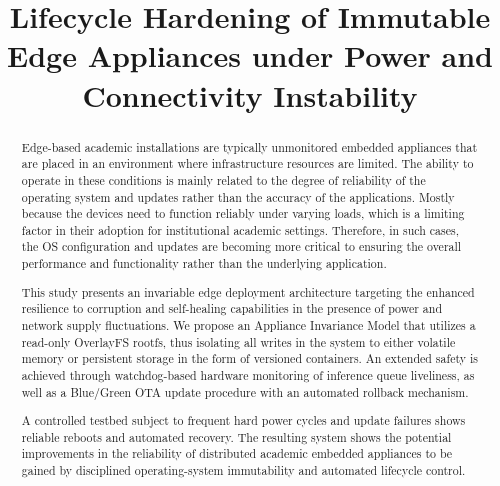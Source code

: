 \documentclass[conference]{IEEEtran}
\begin{document}
\title{Lifecycle Hardening of Immutable Edge Appliances under Power and Connectivity Instability}

\author{
}

\maketitle

\begin{abstract}
Edge-based academic installations are typically unmonitored embedded appliances that are placed in an environment where infrastructure resources are limited. The ability to operate in these conditions is mainly related to the degree of reliability of the operating system and updates rather than the accuracy of the applications. Mostly because the devices need to function reliably under varying loads, which is a limiting factor in their adoption for institutional academic settings. Therefore, in such cases, the OS configuration and updates are becoming more critical to ensuring the overall performance and functionality rather than the underlying application.

This study presents an invariable edge deployment architecture targeting the enhanced resilience to corruption and self-healing capabilities in the presence of power and network supply fluctuations. We propose an Appliance Invariance Model that utilizes a read-only OverlayFS rootfs, thus isolating all writes in the system to either volatile memory or persistent storage in the form of versioned containers. An extended safety is achieved through watchdog-based hardware monitoring of inference queue liveliness, as well as a Blue/Green OTA update procedure with an automated rollback mechanism.

A controlled testbed subject to frequent hard power cycles and update failures shows reliable reboots and automated recovery. The resulting system shows the potential improvements in the reliability of distributed academic embedded appliances to be gained by disciplined operating-system immutability and automated lifecycle control.
\end{abstract}
\end{document}
